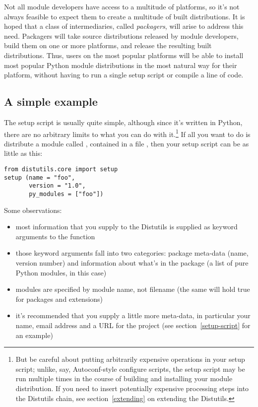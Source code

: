 \documentclass{howto}
\begin{document}
Not all module developers have access to a multitude of platforms, so
it's not always feasible to expect them to create a multitude of built
distributions.  It is hoped that a class of intermediaries, called
\emph{packagers}, will arise to address this need.  Packagers will take
source distributions released by module developers, build them on one or
more platforms, and release the resulting built distributions.  Thus,
users on the most popular platforms will be able to install most popular
Python module distributions in the most natural way for their platform,
without having to run a single setup script or compile a line of code.


\subsection{A simple example}
\label{simple-example}

The setup script is usually quite simple, although since it's written in
Python, there are no arbitrary limits to what you can do with
it.\footnote{But be careful about putting arbitrarily expensive
  operations in your setup script; unlike, say, Autoconf-style configure
  scripts, the setup script may be run multiple times in the course of
  building and installing your module distribution.  If you need to
  insert potentially expensive processing steps into the Distutils
  chain, see section~\ref{extending} on extending the Distutils.}  If
all you want to do is distribute a module called , contained
in a file , then your setup script can be as little as
this:
\begin{verbatim}
from distutils.core import setup
setup (name = "foo",
       version = "1.0",
       py_modules = ["foo"])
\end{verbatim}

Some observations:
\begin{itemize}
\item most information that you supply to the Distutils is supplied as
  keyword arguments to the  function
\item those keyword arguments fall into two categories: package
  meta-data (name, version number) and information about what's in the
  package (a list of pure Python modules, in this case)
\item modules are specified by module name, not filename (the same will
  hold true for packages and extensions)
\item it's recommended that you supply a little more meta-data, in
  particular your name, email address and a URL for the project
  (see section~\ref{setup-script} for an example)
\end{itemize}
\end{document}
